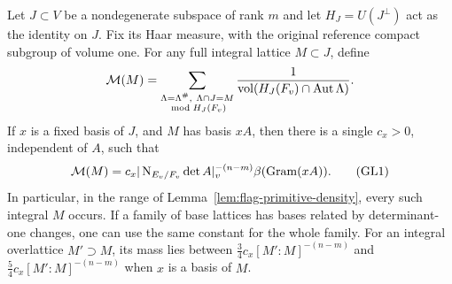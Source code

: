 \begin{proposition}\label{prop:flag-primitive-mass}
Let \(J\subset V\) be a nondegenerate subspace of rank \(m\) and
let \(H_J=U(J^\perp)\) act as the identity on \(J\).
Fix its Haar measure, with the original reference compact subgroup
of volume one. For any full integral lattice \(M\subset J\), define
\[
 {\cal M}(M)=
 \sum_{\substack{\Lambda=\Lambda^\#,\ \Lambda\cap J=M\\
                   \bmod H_J(F_v)}}
 \frac1{\operatorname{vol}(H_J(F_v)\cap\operatorname{Aut}\Lambda)}.
\]
If \(x\) is a fixed basis of \(J\), and \(M\) has basis \(xA\), then
there is a single \(c_x>0\), independent of \(A\), such that
\[
 {\cal M}(M)=c_x|\operatorname{N}_{E_v/F_v}\det A|_v^{-(n-m)}
                      \beta(\operatorname{Gram}(xA)).
 \tag{GL1}
\]
In particular, in the range of Lemma~\ref{lem:flag-primitive-density},
every such integral \(M\) occurs. If a family of base lattices
has bases related by determinant-one changes, one can use the
same constant for the whole family. For an integral overlattice
\(M'\supset M\), its mass lies between
\(\tfrac34 c_x [M':M]^{-(n-m)}\) and
\(\tfrac54 c_x [M':M]^{-(n-m)}\) when \(x\) is a basis of \(M\).
\end{proposition}
